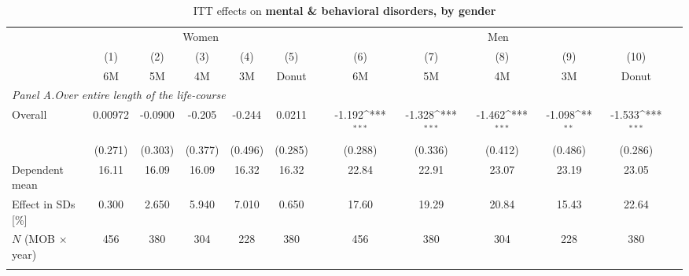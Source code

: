 \begin{landscape}
\vspace*{\fill}
 \begin{table}[H] \centering 
 	\begin{threeparttable} \centering \caption{ITT effects on \textbf{mental \& behavioral disorders, by gender}}\label{tab_mlch: DD_d5_female_male} {\def\sym#1{\ifmmode^{#1}\else\(^{#1}\)\fi} 
 			\begin{tabular}{l*{12}{c}}
 				\toprule 
 				& \multicolumn{5}{c}{Women} && \multicolumn{5}{c}{Men} \\ 
 				\cmidrule(lr){2-6} \cmidrule(lr){8-12}
 				&\multicolumn{1}{c}{(1)}&\multicolumn{1}{c}{(2)}&\multicolumn{1}{c}{(3)}&\multicolumn{1}{c}{(4)}&\multicolumn{1}{c}{(5)}&\multicolumn{1}{c}{        }&\multicolumn{1}{c}{(6)}&\multicolumn{1}{c}{(7)}&\multicolumn{1}{c}{(8)}&\multicolumn{1}{c}{(9)}&\multicolumn{1}{c}{(10)}\\
 				&\multicolumn{1}{c}{6M}&\multicolumn{1}{c}{5M}&\multicolumn{1}{c}{4M}&\multicolumn{1}{c}{3M}&\multicolumn{1}{c}{Donut}&&\multicolumn{1}{c}{6M}&\multicolumn{1}{c}{5M}&\multicolumn{1}{c}{4M}&\multicolumn{1}{c}{3M}&\multicolumn{1}{c}{Donut}\\
 				\midrule
 				\multicolumn{5}{l}{\emph{Panel A.Over entire length of the life-course}} \\


 				\hspace*{10pt}Overall&     0.00972         &     -0.0900         &      -0.205         &      -0.244         &      0.0211       & &      -1.192\sym{***}&      -1.328\sym{***}&      -1.462\sym{***}&      -1.098\sym{**} &      -1.533\sym{***}\\
				                    &     (0.271)         &     (0.303)         &     (0.377)         &     (0.496)         &     (0.285)        & &     (0.288)         &     (0.336)         &     (0.412)         &     (0.486)         &     (0.286)         \\
				\midrule Dependent mean&       16.11         &       16.09         &       16.09         &       16.32         &       16.32     & &       22.84         &       22.91         &       23.07         &       23.19         &       23.05         \\
				Effect in SDs [\%]  &       0.300         &       2.650         &       5.940         &       7.010         &       0.650        & &       17.60         &       19.29         &       20.84         &       15.43         &       22.64         \\
				\(N\) (MOB $\times$ year)&         456         &         380         &         304         &         228         &         380   & &         456         &         380         &         304         &         228         &         380         \\
				\\


\end{tabular}}
\end{threeparttable}
\end{table}
\end{landscape}
